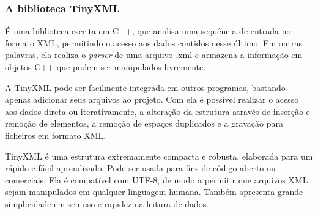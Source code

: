 \subsubsection{A biblioteca TinyXML}
\label{tinyXML}
%
É uma biblioteca escrita em C++, que analisa uma sequência de entrada no formato XML, permitindo o acesso aos dados contidos nesse último. Em outras palavras, ela realiza o \textit{parser} de uma arquivo .xml e armazena a informação em objetos C++ que podem ser manipulados livremente. 
\par 
A TinyXML \cite{TinyXMLTutorial} pode ser facilmente integrada em outros programas, bastando apenas adicionar seus arquivos ao projeto. Com ela é possível realizar o acesso aos dados direta ou iterativamente, a alteração da estrutura através 
de inserção e remoção de elementos, a remoção de espaços duplicados e a gravação para ficheiros em formato XML.

TinyXML é uma estrutura extremamente compacta e robusta, elaborada para um rápido e fácil aprendizado. Pode ser usada para fins de código aberto ou comerciais. Ela é compatível com UTF-8, de modo a permitir que arquivos XML sejam manipulados em qualquer linguagem humana. Também apresenta grande simplicidade em seu uso e rapidez na leitura de dados.
%
%
